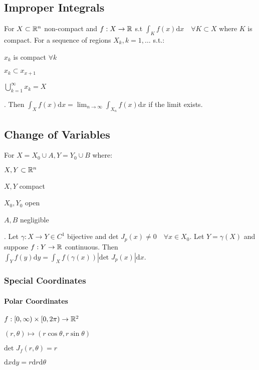 \subsection{Improper Integrals}
For $X \subset \mathbb{R}^n$ non-compact and $f: X \to \mathbb{R}$ s.t $\int_K f(x) \mathrm{d}x \quad \forall K \subset X$ where $K$ is compact. For a sequence of regions $X_k, k = 1, \dots$ s.t.:
\begin{inparaitem}
    \item $x_k$ is compact $\forall k$
    \item $x_k \subset x_{x + 1}$
    \item $\bigcup_{k = 1}^{\infty} x_k = X$
\end{inparaitem}.
Then $\int_{X} f(x) \mathrm{d}x = \lim_{n \to \infty} \int_{X_n} f(x) \mathrm{d}x$ if the limit exists.

\subsection{Change of Variables}
For $X = X_0 \cup A, Y = Y_0 \cup B$ where:
\begin{inparaitem}
    \item $X, Y \subset \mathbb{R}^n$
    \item $X, Y$ compact
    \item $X_0, Y_0$ open 
    \item $A, B$ negligible
\end{inparaitem}.
Let $\gamma: X \to Y \in C^1$ bijective and $\text{det }J_p(x) \neq 0 \quad \forall x \in X_0$. Let $Y = \gamma(X)$ and suppose $f: Y \to \mathbb{R}$ continuous. Then $\int_{Y} f(y) \mathrm{d}y = \int_{X} f(\gamma(x)) | \text{det }J_p(x) | \mathrm{d}x$.

\subsubsection{Special Coordinates}
\paragraph{Polar Coordinates}
\begin{inparaitem}
    \item $f: [0, \infty) \times [0, 2\pi) \to \mathbb{R}^2$
    \item $(r, \theta) \mapsto (r \cos \theta, r \sin \theta)$
    \item $\text{det }J_f(r, \theta) = r$
    \item $\mathrm{d}x\mathrm{d}y = r\mathrm{d}r\mathrm{d}\theta$
\end{inparaitem}

